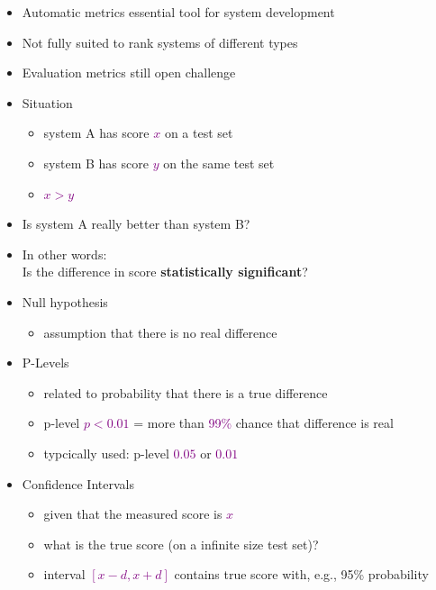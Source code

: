 \documentclass[landscape]{slides}
\newcommand{\maths}[1]{\textcolor{purple}{#1}}
\begin{document}
\vspace{35mm}
\begin{itemize} \itemsep 10mm
\item Automatic metrics essential tool for system development
\item Not fully suited to rank systems of different types 
\item Evaluation metrics still open challenge
\end{itemize}



\vspace{20mm}
\begin{itemize}
\item Situation
\begin{itemize}
\item system A has score \maths{$x$} on a test set
\item system B has score \maths{$y$} on the same test set
\item \maths{$x > y$}
\end{itemize}
\item Is system A really better than system B?
\item In other words:\\
Is the difference in score {\bf statistically significant}?
\end{itemize}


\vspace{10mm}
\begin{itemize}
\item Null hypothesis
\begin{itemize}
\item assumption that there is no real difference
\end{itemize}
\item P-Levels
\begin{itemize}
\item related to probability that there is a true difference
\item p-level \maths{$p<0.01$} = more than \maths{99\%} chance that difference is real
\item typcically used: p-level \maths{$0.05$} or \maths{$0.01$}
\end{itemize}
\item Confidence Intervals
\begin{itemize}
\item given that the measured score is \maths{$x$}
\item what is the true score (on a infinite size test set)?
\item interval \maths{$[x-d,x+d]$} contains true score with, e.g., 95\% probability
\end{itemize}
\end{itemize}
\end{document}
